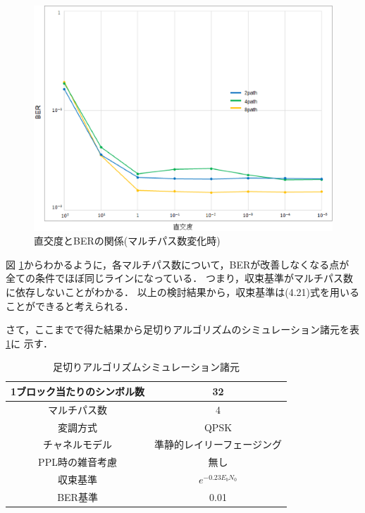\begin{figure}[t]
    \centering
    \includegraphics[width=0.95\linewidth]{chapter4/figure/CutoffSim2.eps}
    \caption{直交度とBERの関係(マルチパス数変化時)}
    \label{figCutoffSim2}
\end{figure}

図 \ref{figCutoffSim2}からわかるように，各マルチパス数について，BERが改善しなくなる点が
全ての条件でほぼ同じラインになっている．
つまり，収束基準がマルチパス数に依存しないことがわかる．
以上の検討結果から，収束基準は(4.21)式を用いることができると考えられる．

さて，ここまでで得た結果から足切りアルゴリズムのシミュレーション諸元を表 \ref{tabCutoff3}に
示す．

\begin{table}[t]
    \begin{tabular}{|c|c|} \hline
        1ブロック当たりのシンボル数 & 32 \\ \hline
        マルチパス数 & 4 \\ \hline
        変調方式 & QPSK \\ \hline
        チャネルモデル & 準静的レイリーフェージング \\ \hline
        PPL時の雑音考慮 & 無し \\ \hline
        収束基準 & $e^{-0.23E_bN_0}$ \\ \hline
        BER基準 & 0.01 \\ \hline
    \end{tabular}
    \centering
    \caption{足切りアルゴリズムシミュレーション諸元}
    \label{tabCutoff3}
\end{table}

